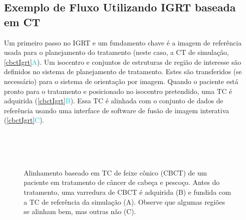 \documentclass[11pt,a4paper]{article}
\begin{document}
\subsection{Exemplo de Fluxo Utilizando IGRT baseada em CT}

	Um primeiro passo no IGRT e um fundamento chave é a imagem de referência usada para o planejamento do tratamento (neste caso, a CT de simulação, \ref{cbctIgrt}\textcolor{DarkTurquoise}{A}). Um isocentro e conjuntos de estruturas de região de interesse são definidos no sistema de planejamento de tratamento. Estes são transferidos (se necessário) para o sistema de orientação por imagem. Quando o paciente está pronto para o tratamento e posicionado no isocentro pretendido, uma TC é adquirida (\ref{cbctIgrt}\textcolor{DarkTurquoise}{B}). Essa TC é alinhada com o conjunto de dados de referência usando uma interface de software de fusão de imagem interativa (\ref{cbctIgrt}\textcolor{DarkTurquoise}{C}).
	\begin{figure}[!h]
		\centering
		 \\
		 \\ %
		 \\ %
		\caption{Alinhamento baseado em TC de feixe cônico (CBCT) de um paciente em tratamento de câncer de cabeça e pescoço. Antes do tratamento, uma varredura de CBCT é adquirida (B) e fundida com a TC de referência da simulação (A). Observe que algumas regiões se alinham bem, mas outras não (C).}
		\label{fig:cbctIgrt}
	\end{figure}
\end{document}
